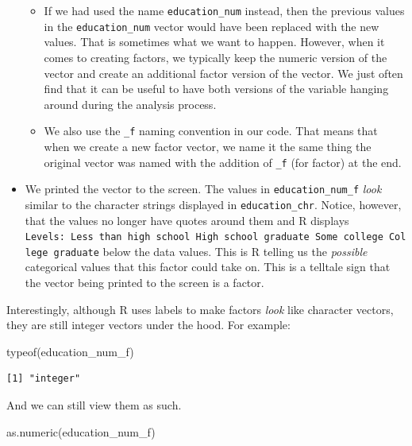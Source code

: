 \documentclass[
  letterpaper,
  DIV=11,
  numbers=noendperiod]{scrreprt}
\newenvironment{Shaded}{\begin{snugshade}}{\end{snugshade}}
\newcommand{\FunctionTok}[1]{\textcolor[rgb]{0.28,0.35,0.67}{#1}}
\newcommand{\NormalTok}[1]{\textcolor[rgb]{0.00,0.23,0.31}{#1}}
\begin{document}
\begin{itemize}
  \begin{itemize}
  \item
    If we had used the name \texttt{education\_num} instead, then the
    previous values in the \texttt{education\_num} vector would have
    been replaced with the new values. That is sometimes what we want to
    happen. However, when it comes to creating factors, we typically
    keep the numeric version of the vector and create an additional
    factor version of the vector. We just often find that it can be
    useful to have both versions of the variable hanging around during
    the analysis process.
  \item
    We also use the \texttt{\_f} naming convention in our code. That
    means that when we create a new factor vector, we name it the same
    thing the original vector was named with the addition of
    \texttt{\_f} (for factor) at the end.
  \end{itemize}
\item
  We printed the vector to the screen. The values in
  \texttt{education\_num\_f} \emph{look} similar to the character
  strings displayed in \texttt{education\_chr}. Notice, however, that
  the values no longer have quotes around them and R displays
  \texttt{Levels:\ Less\ than\ high\ school\ High\ school\ graduate\ Some\ college\ College\ graduate}
  below the data values. This is R telling us the \emph{possible}
  categorical values that this factor could take on. This is a telltale
  sign that the vector being printed to the screen is a factor.
\end{itemize}

Interestingly, although R uses labels to make factors \emph{look} like
character vectors, they are still integer vectors under the hood. For
example:

\begin{Shaded}
\begin{Highlighting}[]
\FunctionTok{typeof}\NormalTok{(education\_num\_f)}
\end{Highlighting}
\end{Shaded}

\begin{verbatim}
[1] "integer"
\end{verbatim}

And we can still view them as such.

\begin{Shaded}
\begin{Highlighting}[]
\FunctionTok{as.numeric}\NormalTok{(education\_num\_f)}
\end{Highlighting}
\end{Shaded}
\end{document}
